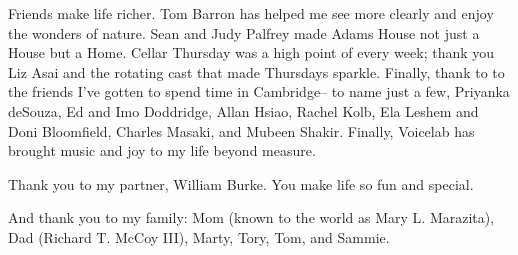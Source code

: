 Friends make life richer. Tom Barron has helped me see more clearly and enjoy the wonders of nature. Sean and Judy Palfrey made Adams House not just a House but a Home. Cellar Thursday was a high point of every week; thank you Liz Asai and the rotating cast that made Thursdays sparkle. Finally, thank to to the friends I've gotten to spend time in Cambridge-- to name just a few, Priyanka deSouza, Ed and Imo Doddridge, Allan Hsiao, Rachel Kolb, Ela Leshem and Doni Bloomfield, Charles Masaki, and Mubeen Shakir. Finally, Voicelab has brought music and joy to my life beyond measure. 

Thank you to my partner, William Burke. You make life so fun and special.

And thank you to my family: Mom (known to the world as Mary L. Marazita), Dad (Richard T. McCoy III), Marty, Tory, Tom, and Sammie. 


